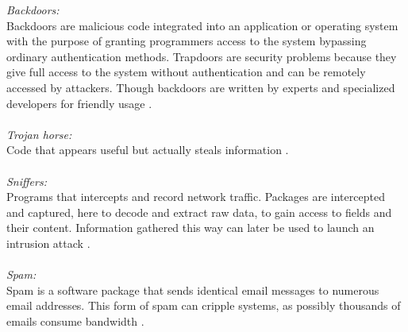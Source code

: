 \documentclass[12pt]{article} %
\begin{document}
\emph{Backdoors:} \\
Backdoors are malicious code integrated into an application or operating system with the purpose of granting programmers access to the system bypassing ordinary authentication methods. Trapdoors are security problems because they give full access to the system without authentication and can be remotely accessed by attackers. Though backdoors are written by experts and specialized developers for friendly usage \cite{Asurveyonmalware}. \\ \\

\emph{Trojan horse:} \\
Code that appears useful but actually steals information \cite{Asurveyonmalware}. \\ \\

\emph{Sniffers:} \\
Programs that intercepts and record network traffic.  Packages are intercepted and captured, here to decode and extract raw data, to gain access to fields and their content. Information gathered this way can later be used to launch an intrusion attack \cite{Asurveyonmalware}. \\ \\

\emph{Spam:} \\
Spam is a software package that sends identical email messages to numerous email addresses. This form of spam can cripple systems, as possibly thousands of emails consume bandwidth \cite{Asurveyonmalware}.  \\ \\
\end{document}
